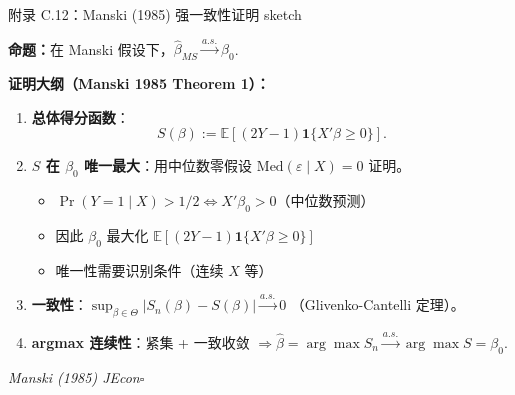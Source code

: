 \documentclass[aspectratio=169, 10pt]{beamer}
\begin{document}
\begin{frame}{附录 C.12：Manski (1985) 强一致性证明 sketch}
  \hypertarget{proof-c12}{}

  \textbf{命题：}在 Manski 假设下，$\hat\beta_{MS} \overset{a.s.}{\to} \beta_0$.

  \textbf{证明大纲（Manski 1985 Theorem 1）：}
  \begin{enumerate}\setlength{\itemsep}{1pt}
    \item \textbf{总体得分函数}：
    $$S(\beta) := \mathbb{E}[(2Y - 1) \mathbf{1}\{X'\beta \geq 0\}].$$

    \item \textbf{$S$ 在 $\beta_0$ 唯一最大}：用中位数零假设 $\text{Med}(\varepsilon\mid X) = 0$ 证明。
    \begin{itemize}\setlength{\itemsep}{1pt}
      \item $\Pr(Y=1\mid X) > 1/2 \Leftrightarrow X'\beta_0 > 0$（中位数预测）
      \item 因此 $\beta_0$ 最大化 $\mathbb{E}[(2Y-1) \mathbf{1}\{X'\beta \geq 0\}]$
      \item 唯一性需要识别条件（连续 $X$ 等）
    \end{itemize}

    \item \textbf{一致性}：$\sup_{\beta \in \Theta} |S_n(\beta) - S(\beta)| \overset{a.s.}{\to} 0$
    （Glivenko-Cantelli 定理）。

    \item \textbf{argmax 连续性}：紧集 + 一致收敛 $\Rightarrow \hat\beta = \arg\max S_n \overset{a.s.}{\to} \arg\max S = \beta_0$.
  \end{enumerate}

  \hfill{\scriptsize\textit{Manski (1985) JEcon}}\quad$\square$
  \hfill{\scriptsize\hyperlink{main-c12}{}}

\end{frame}
\end{document}
